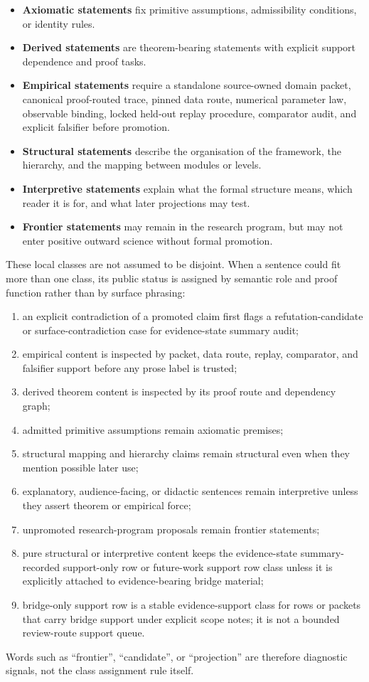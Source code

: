 \begin{itemize}
\item \textbf{Axiomatic statements} fix primitive assumptions, admissibility
      conditions, or identity rules.
\item \textbf{Derived statements} are theorem-bearing statements with explicit support
      dependence and proof tasks.
\item \textbf{Empirical statements} require a standalone source-owned domain
      packet, canonical proof-routed trace, pinned data route, numerical
      parameter law, observable binding, locked held-out replay procedure,
      comparator audit, and explicit falsifier before promotion.
\item \textbf{Structural statements} describe the organisation of the framework,
      the hierarchy, and the mapping between modules or levels.
\item \textbf{Interpretive statements} explain what the formal structure means,
      which reader it is for, and what later projections may test.
\item \textbf{Frontier statements} may remain in the research program, but may
      not enter positive outward science without formal promotion.
\end{itemize}
These local classes are not assumed to be disjoint. When a sentence could fit
more than one class, its public status is assigned by semantic role and proof
function rather than by surface phrasing:
\begin{enumerate}
\item an explicit contradiction of a promoted claim first flags a
      refutation-candidate or surface-contradiction case for evidence-state summary audit;
\item empirical content is inspected by packet, data route, replay,
      comparator, and falsifier support before any prose label is trusted;
\item derived theorem content is inspected by its proof route and dependency
      graph;
\item admitted primitive assumptions remain axiomatic premises;
\item structural mapping and hierarchy claims remain structural even when
      they mention possible later use;
\item explanatory, audience-facing, or didactic sentences remain interpretive
      unless they assert theorem or empirical force;
\item unpromoted research-program proposals remain frontier statements;
\item pure structural or interpretive content keeps the evidence-state summary-recorded
      support-only row or future-work support row class unless it is explicitly
      attached to evidence-bearing bridge material;
\item bridge-only support row is a stable evidence-support class for rows or
      packets that carry bridge support under explicit scope notes; it is not a
      bounded review-route support queue.
\end{enumerate}
Words such as ``frontier'', ``candidate'', or ``projection'' are therefore
diagnostic signals, not the class assignment rule itself.

